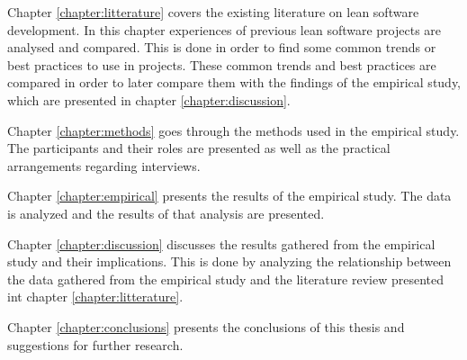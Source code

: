 Chapter \ref{chapter:litterature} covers the existing literature on lean software development. In this chapter experiences of previous lean software projects are analysed and compared. This is done in order to find some common trends or best practices to use in projects. These common trends and best practices are compared in order to later compare them with the findings of the empirical study, which are presented in chapter \ref{chapter:discussion}.

Chapter \ref{chapter:methods} goes through the methods used in the empirical study. The participants and their roles are presented as well as the practical arrangements regarding interviews.

Chapter \ref{chapter:empirical} presents the results of the empirical study. The data is analyzed and the results of that analysis are presented.

Chapter \ref{chapter:discussion} discusses the results gathered from the empirical study and their implications. This is done by analyzing the relationship between the data gathered from the empirical study and the literature review presented int chapter \ref{chapter:litterature}.

Chapter \ref{chapter:conclusions} presents the conclusions of this thesis and suggestions for further research.
